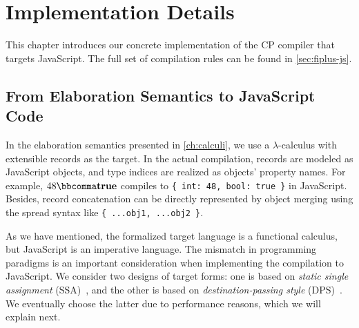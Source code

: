 \chapter{Implementation Details} \label{ch:compilation}

This chapter introduces our concrete implementation of the CP compiler that
targets JavaScript. The full set of compilation rules can be found in
\autoref{sec:fiplus-js}.

\section{From Elaboration Semantics to JavaScript Code}

In the elaboration semantics presented in \autoref{ch:calculi}, we use a
$\lambda$-calculus with extensible records as the target. In the actual
compilation, records are modeled as JavaScript objects, and type indices are
realized as objects' property names. For example, $48  \bbcomma   \mathbf{true} $ compiles to
\lstinline|{ int: 48, bool: true }| in JavaScript. Besides, record concatenation
can be directly represented by object merging using the spread syntax like
\lstinline|{ ...obj1, ...obj2 }|.

As we have mentioned, the formalized target language is a functional calculus,
but JavaScript is an imperative language. The mismatch in programming paradigms
is an important consideration when implementing the compilation to JavaScript.
We consider two designs of target forms: one is based on \emph{static single
assignment} (SSA)~\citep{cytron1991efficiently}, and the other is based on
\emph{destination-passing style} (DPS)~\citep{shaikhha2017destination}. We
eventually choose the latter due to performance reasons, which we will explain
next.

